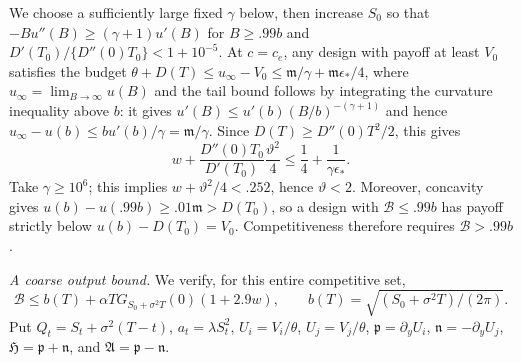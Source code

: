 \documentclass[mnsc]{informs3}
\begin{document}
\begin{APPENDICES}
{We choose a sufficiently large fixed $\gamma$ below, then increase $S_0$
so that $-Bu''(B)\geq(\gamma+1)u'(B)$ for $B\geq.99b$ and
$D'(T_0)/\{D''(0)T_0\}<1+10^{-5}$.
At $c=c_e$, any design with payoff at least $V_0$ satisfies
the budget $\theta+D(T)\leq u_\infty-V_0\leq {\mathfrak m}/\gamma+{\mathfrak m}{\epsilon_*}/4$,
where $u_\infty=\lim_{B\to\infty}u(B)$ and the tail bound follows
by integrating the curvature inequality above $b$: it gives
$u'(B)\leq u'(b)(B/b)^{-(\gamma+1)}$ and hence
$u_\infty-u(b)\leq bu'(b)/\gamma={\mathfrak m}/\gamma$. Since
$D(T)\geq D''(0)T^2/2$, this gives
\[
w+\frac{D''(0)T_0}{D'(T_0)}\frac{{\vartheta}^2}{4}
\leq\frac14+\frac1{\gamma {\epsilon_*}}.
\]
Take $\gamma\geq10^6$; this implies $w+{\vartheta}^2/4<.252$, hence ${\vartheta}<2$.
Moreover, concavity gives $u(b)-u(.99b)\geq.01{\mathfrak m}>D(T_0)$,
so a design with $\mathcal B\leq.99b$ has payoff strictly below
$u(b)-D(T_0)=V_0$. Competitiveness therefore requires
$\mathcal B>.99b$.

\emph{A coarse output bound.}
We verify, for this entire competitive set,
\begin{equation}\label{eq-design-competitive-output-screen}
\mathcal B\leq b(T)+\alpha T G_{S_0+\sigma^2T}(0)(1+2.9w),
\qquad b(T)=\sqrt{(S_0+\sigma^2T)/(2\pi)}.
\end{equation}
Put $Q_t=S_t+\sigma^2(T-t)$, $a_t=\lambda S_t^2$,
$U_i=V_i/\theta$, $U_j=V_j/\theta$, ${\mathfrak p}=\partial_yU_i$, ${\mathfrak n}=-\partial_yU_j$,
${\mathfrak H}={\mathfrak p}+{\mathfrak n}$, and ${\mathfrak A}={\mathfrak p}-{\mathfrak n}$.

}
\end{APPENDICES}
\end{document}

